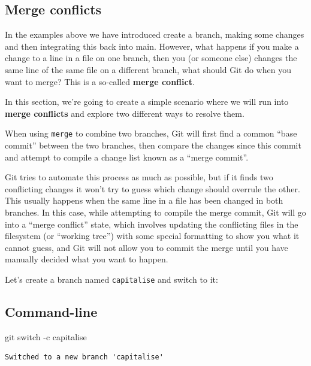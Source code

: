 \documentclass[
  letterpaper,
  DIV=11,
  numbers=noendperiod]{scrartcl}
\newenvironment{Shaded}{\begin{snugshade}}{\end{snugshade}}
\newcommand{\AttributeTok}[1]{\textcolor[rgb]{0.40,0.45,0.13}{#1}}
\newcommand{\FunctionTok}[1]{\textcolor[rgb]{0.28,0.35,0.67}{#1}}
\newcommand{\NormalTok}[1]{\textcolor[rgb]{0.00,0.23,0.31}{#1}}
\begin{document}
\subsection{Merge conflicts}\label{merge-conflicts}

In the examples above we have introduced create a branch, making some
changes and then integrating this back into main. However, what happens
if you make a change to a line in a file on one branch, then you (or
someone else) changes the same line of the same file on a different
branch, what should Git do when you want to merge? This is a so-called
\textbf{merge conflict}.

In this section, we're going to create a simple scenario where we will
run into \textbf{merge conflicts} and explore two different ways to
resolve them.

When using \texttt{merge} to combine two branches, Git will first find a
common ``base commit'' between the two branches, then compare the
changes since this commit and attempt to compile a change list known as
a ``merge commit''.

Git tries to automate this process as much as possible, but if it finds
two conflicting changes it won't try to guess which change should
overrule the other. This usually happens when the same line in a file
has been changed in both branches. In this case, while attempting to
compile the merge commit, Git will go into a ``merge conflict'' state,
which involves updating the conflicting files in the filesystem (or
``working tree'') with some special formatting to show you what it
cannot guess, and Git will not allow you to commit the merge until you
have manually decided what you want to happen.

Let's create a branch named \texttt{capitalise} and switch to it:

\subsection{Command-line}

\begin{Shaded}
\begin{Highlighting}[]
\FunctionTok{git}\NormalTok{ switch }\AttributeTok{{-}c}\NormalTok{ capitalise}
\end{Highlighting}
\end{Shaded}

\begin{verbatim}
Switched to a new branch 'capitalise'
\end{verbatim}
\end{document}
